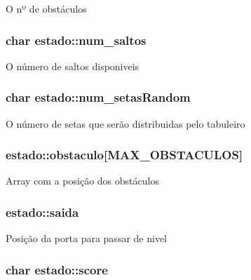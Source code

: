 O nº de obstáculos \hypertarget{structestado_aba4d98f3c3002a7651b1c4a97230a9f7}{
\subsubsection[{num\+\_\+saltos}]{\setlength{\rightskip}{0pt plus 5cm}char estado\+::num\+\_\+saltos}}\label{structestado_aba4d98f3c3002a7651b1c4a97230a9f7}
O número de saltos disponiveis \hypertarget{structestado_a132c56893325814012232e77277ec756}{
\subsubsection[{num\+\_\+setas\+Random}]{\setlength{\rightskip}{0pt plus 5cm}char estado\+::num\+\_\+setas\+Random}}\label{structestado_a132c56893325814012232e77277ec756}
O número de setas que serão distribuidas pelo tabuleiro \hypertarget{structestado_a970dc20c6687acb17c3f08c06edbed4f}{
\subsubsection[{obstaculo}]{ estado\+::obstaculo\mbox{[}{\bf M\+A\+X\+\_\+\+O\+B\+S\+T\+A\+C\+U\+L\+O\+S}\mbox{]}}}\label{structestado_a970dc20c6687acb17c3f08c06edbed4f}
Array com a posição dos obstáculos \hypertarget{structestado_aca05b4bb64bbb53c0dab2dc61971ed91}{
\subsubsection[{saida}]{ estado\+::saida}}\label{structestado_aca05b4bb64bbb53c0dab2dc61971ed91}
Posição da porta para passar de nivel \hypertarget{structestado_a312d7aee47aeea05c30f01ff16fa8679}{
\subsubsection[{score}]{\setlength{\rightskip}{0pt plus 5cm}char estado\+::score}}\label{structestado_a312d7aee47aeea05c30f01ff16fa8679}
